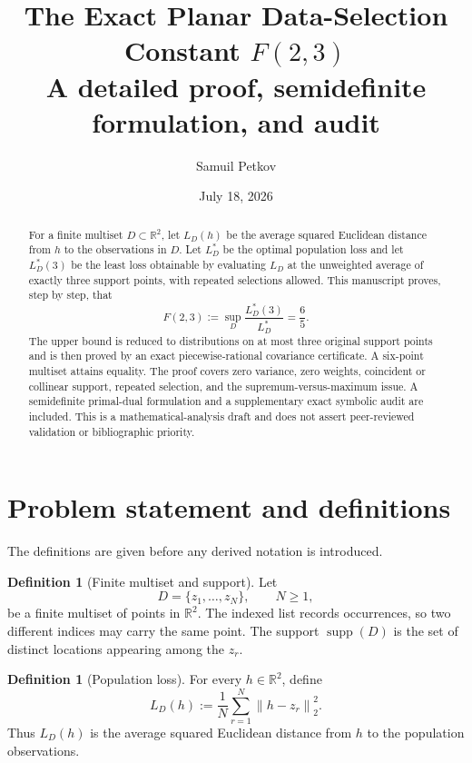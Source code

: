 \documentclass[11pt]{article}
\title{\textbf{The Exact Planar Data-Selection Constant $F(2,3)$}\\[4pt]
\large A detailed proof, semidefinite formulation, and audit}
\author{Samuil Petkov}
\date{July 18, 2026}
\theoremstyle{definition}
\newtheorem{definition}[theorem]{Definition}
\theoremstyle{remark}
\newcommand{\R}{\mathbb{R}}
\newcommand{\supp}{\operatorname{supp}}
\newcommand{\norm}[1]{\left\lVert #1\right\rVert}
\begin{document}
\maketitle

\begin{abstract}
For a finite multiset $D\subset\R^2$, let $L_D(h)$ be the average squared Euclidean distance from $h$ to the observations in $D$.  Let $L_D^*$ be the optimal population loss and let $L_D^*(3)$ be the least loss obtainable by evaluating $L_D$ at the unweighted average of exactly three support points, with repeated selections allowed.  This manuscript proves, step by step, that
\[
F(2,3):=\sup_D\frac{L_D^*(3)}{L_D^*}=\frac65.
\]
The upper bound is reduced to distributions on at most three original support points and is then proved by an exact piecewise-rational covariance certificate.  A six-point multiset attains equality.  The proof covers zero variance, zero weights, coincident or collinear support, repeated selection, and the supremum-versus-maximum issue.  A semidefinite primal-dual formulation and a supplementary exact symbolic audit are included.  This is a mathematical-analysis draft and does not assert peer-reviewed validation or bibliographic priority.
\end{abstract}

\tableofcontents

\section{Problem statement and definitions}

The definitions are given before any derived notation is introduced.

\begin{definition}[Finite multiset and support]
Let
\[
D=\{z_1,\ldots,z_N\},\qquad N\ge 1,
\]
be a finite multiset of points in $\R^2$.  The indexed list records occurrences, so two different indices may carry the same point.  The support $\supp(D)$ is the set of distinct locations appearing among the $z_r$.
\end{definition}

\begin{definition}[Population loss]
For every $h\in\R^2$, define
\begin{equation}
L_D(h):=\frac1N\sum_{r=1}^N \norm{h-z_r}_2^2.
\label{eq:def-L}
\end{equation}
Thus $L_D(h)$ is the average squared Euclidean distance from $h$ to the population observations.
\end{definition}
\end{document}
